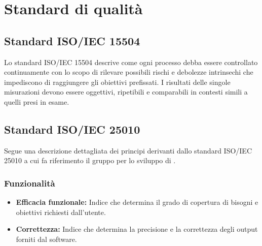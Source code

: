 \chapter{Standard di qualità}
\section{Standard ISO/IEC 15504}
Lo standard ISO/IEC 15504 descrive come ogni processo debba essere controllato continuamente con lo scopo di rilevare possibili rischi e debolezze intrinsechi che impediscono di raggiungere gli obiettivi prefissati. I risultati delle singole misurazioni devono essere oggettivi, ripetibili e comparabili in contesti simili a quelli presi in esame. 
\section{Standard ISO/IEC 25010}
Segue una descrizione dettagliata dei principi derivanti dallo standard ISO/IEC 25010 a cui fa riferimento il gruppo per lo sviluppo di .

\subsection{Funzionalità}
\begin{itemize}
	\item \textbf{Efficacia funzionale:} Indice che determina il grado di copertura di bisogni e obiettivi richiesti dall'utente.
	\item \textbf{Correttezza:} Indice che determina la precisione e la correttezza degli output forniti dal software.
\end{itemize}
